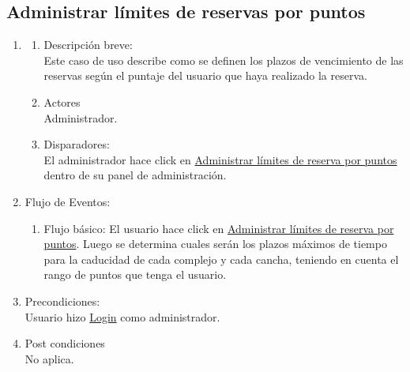 \documentclass[a4paper,11pt]{article}
\begin{document}
\subsection{Administrar límites de reservas por puntos}
\begin{enumerate}

    \item
    \begin{enumerate}
    \item Descripción breve: \\
        Este caso de uso describe como se definen los plazos de vencimiento de
        las reservas según el puntaje del usuario que haya realizado la reserva.
    \item Actores \\
        Administrador.
    \item Disparadores: \\
        El administrador hace click en 
        \underline{Administrar límites de reserva por puntos}
        dentro de su panel de administración.
    \end{enumerate}

    \item Flujo de Eventos: 

    \begin{enumerate}

        \item Flujo básico:
            El usuario hace click en \underline{Administrar límites de reserva
            por puntos}.
            Luego se determina cuales serán los plazos máximos de tiempo para la
            caducidad de cada complejo y cada cancha, teniendo en cuenta el rango
            de puntos que tenga el usuario.
    \end{enumerate}

    \item Precondiciones: \\
        Usuario hizo \underline{Login} como administrador.

    \item Post condiciones \\
        No aplica.

\end{enumerate}

\end{document}
